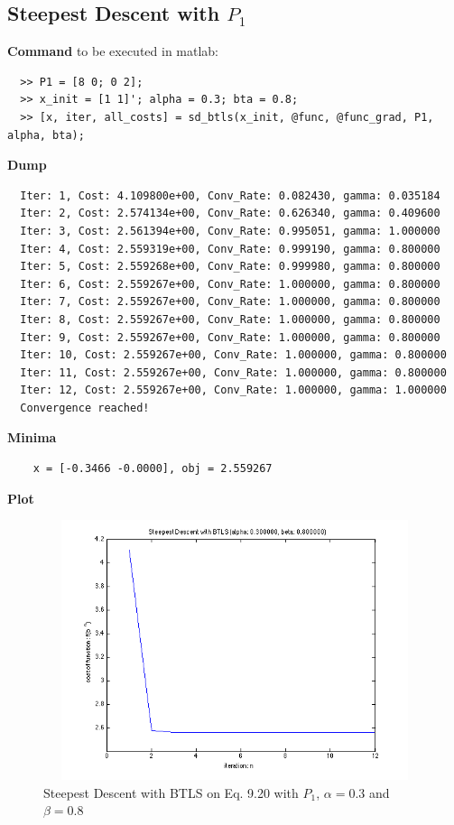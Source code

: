 \documentclass[11pt,a4paper]{article}
\begin{document}
\newpage
\subsection{Steepest Descent with $P_1$}
{\bf Command} to be executed in matlab:
\begin{verbatim}
  >> P1 = [8 0; 0 2];
  >> x_init = [1 1]'; alpha = 0.3; bta = 0.8;
  >> [x, iter, all_costs] = sd_btls(x_init, @func, @func_grad, P1, alpha, bta);
\end{verbatim}
{\bf Dump}
\begin{verbatim}
  Iter: 1, Cost: 4.109800e+00, Conv_Rate: 0.082430, gamma: 0.035184
  Iter: 2, Cost: 2.574134e+00, Conv_Rate: 0.626340, gamma: 0.409600
  Iter: 3, Cost: 2.561394e+00, Conv_Rate: 0.995051, gamma: 1.000000
  Iter: 4, Cost: 2.559319e+00, Conv_Rate: 0.999190, gamma: 0.800000
  Iter: 5, Cost: 2.559268e+00, Conv_Rate: 0.999980, gamma: 0.800000
  Iter: 6, Cost: 2.559267e+00, Conv_Rate: 1.000000, gamma: 0.800000
  Iter: 7, Cost: 2.559267e+00, Conv_Rate: 1.000000, gamma: 0.800000
  Iter: 8, Cost: 2.559267e+00, Conv_Rate: 1.000000, gamma: 0.800000
  Iter: 9, Cost: 2.559267e+00, Conv_Rate: 1.000000, gamma: 0.800000
  Iter: 10, Cost: 2.559267e+00, Conv_Rate: 1.000000, gamma: 0.800000
  Iter: 11, Cost: 2.559267e+00, Conv_Rate: 1.000000, gamma: 0.800000
  Iter: 12, Cost: 2.559267e+00, Conv_Rate: 1.000000, gamma: 1.000000
  Convergence reached!
\end{verbatim}
{\bf Minima}
\begin{verbatim}
    x = [-0.3466 -0.0000], obj = 2.559267 
   \end{verbatim}
{\bf Plot}
\begin{figure}[h]
    \centering
    \includegraphics[width=5in,height=3in]{../ps2_matlab/2.png}
    \caption{Steepest Descent with BTLS on
        Eq. 9.20 with $P_1$, $\alpha = 0.3$ and $\beta = 0.8$}
\end{figure}
\end{document}
